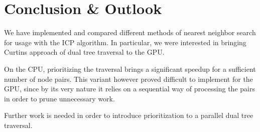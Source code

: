 \documentclass{utue} %
\begin{document}
\section{Conclusion \& Outlook}
We have implemented and compared different methods of nearest neighbor search for usage with the ICP algorithm. In particular, we were interested in bringing Curtins approach\cite{improving} of dual tree traversal to the GPU.

On the CPU, prioritizing the traversal brings a significant speedup for a sufficient number of node pairs. This variant however proved difficult to implement for the GPU, since by its very nature it relies on a sequential way of processing the pairs in order to prune unnecessary work.

Further work is needed in order to introduce prioritization to a parallel dual tree traversal.



\end{document}
